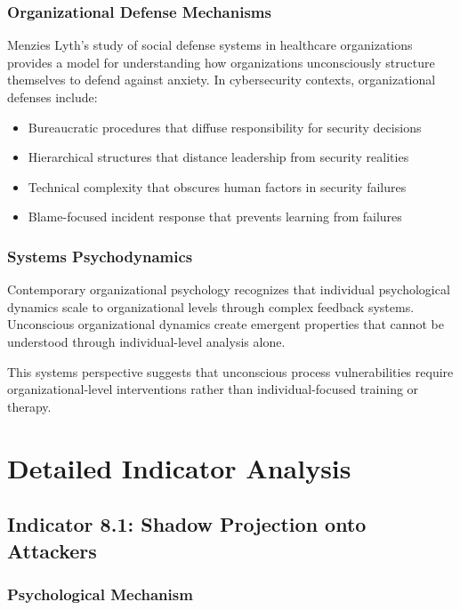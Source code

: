 \documentclass[11pt,a4paper]{article}
\begin{document}
\subsubsection{Organizational Defense Mechanisms}

Menzies Lyth's study of social defense systems in healthcare organizations\cite{menzies1960} provides a model for understanding how organizations unconsciously structure themselves to defend against anxiety. In cybersecurity contexts, organizational defenses include:

\begin{itemize}
\item Bureaucratic procedures that diffuse responsibility for security decisions
\item Hierarchical structures that distance leadership from security realities
\item Technical complexity that obscures human factors in security failures
\item Blame-focused incident response that prevents learning from failures
\end{itemize}

\subsubsection{Systems Psychodynamics}

Contemporary organizational psychology recognizes that individual psychological dynamics scale to organizational levels through complex feedback systems\cite{armstrong2005}. Unconscious organizational dynamics create emergent properties that cannot be understood through individual-level analysis alone.

This systems perspective suggests that unconscious process vulnerabilities require organizational-level interventions rather than individual-focused training or therapy.

\section{Detailed Indicator Analysis}

\subsection{Indicator 8.1: Shadow Projection onto Attackers}

\subsubsection{Psychological Mechanism}
\end{document}
